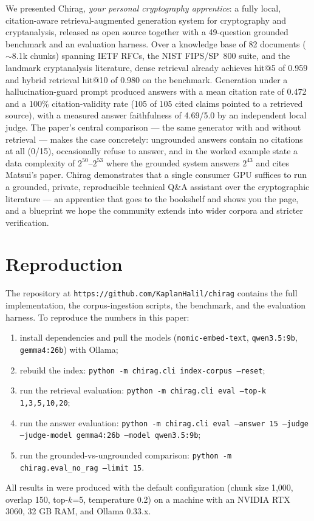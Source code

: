 \documentclass[version=submission]{iacrcc}
\begin{document}
We presented Chirag, \emph{your personal cryptography apprentice}: a fully
local, citation-aware retrieval-augmented generation system for cryptography
and cryptanalysis, released as open source together with a 49-question
grounded benchmark and an evaluation harness. Over a knowledge base of 82
documents ($\sim$8.1k chunks) spanning IETF RFCs, the NIST FIPS/SP~800 suite,
and the landmark cryptanalysis literature, dense retrieval already achieves
hit@5 of 0.959 and hybrid retrieval hit@10 of 0.980 on the benchmark.
Generation under a hallucination-guard prompt produced answers with a mean
citation rate of 0.472 and a 100\% citation-validity rate (105 of 105 cited
claims pointed to a retrieved source), with a measured answer faithfulness of
4.69/5.0 by an independent local judge. The paper's central comparison ---
the same generator with and without retrieval --- makes the case concretely:
ungrounded answers contain no citations at all (0/15), occasionally refuse to
answer, and in the worked example state a data complexity of $2^{50}$--$2^{53}$
where the grounded system answers $2^{43}$ and cites Matsui's paper. Chirag
demonstrates that a single consumer GPU suffices to run a grounded, private,
reproducible technical Q\&A assistant over the cryptographic literature ---
an apprentice that goes to the bookshelf and shows you the page, and a
blueprint we hope the community extends into wider corpora and stricter
verification.



\appendix
\section{Reproduction}
\label{app:repro}
The repository at \texttt{https://github.com/KaplanHalil/chirag}
contains the full implementation, the corpus-ingestion scripts, the benchmark,
and the evaluation harness. To reproduce the numbers in this paper:
\begin{enumerate}
\item install dependencies and pull the models
  (\texttt{nomic-embed-text}, \texttt{qwen3.5:9b}, \texttt{gemma4:26b}) with
  Ollama;
\item rebuild the index: \texttt{python -m chirag.cli index-corpus --reset};
\item run the retrieval evaluation:
  \texttt{python -m chirag.cli eval --top-k 1,3,5,10,20};
\item run the answer evaluation:
  \texttt{python -m chirag.cli eval --answer 15 --judge --judge-model gemma4:26b --model qwen3.5:9b};
\item run the grounded-vs-ungrounded comparison:
  \texttt{python -m chirag.eval\_no\_rag --limit 15}.
\end{enumerate}
All results in  were produced with the default configuration
(chunk size 1{,}000, overlap 150, top-$k$=5, temperature 0.2) on a machine
with an NVIDIA RTX 3060, 32 GB RAM, and Ollama 0.33.x.
\end{document}
